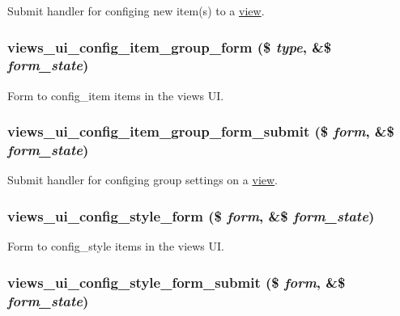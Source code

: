 \label{admin_8inc_a023993084cf3409a55a8831df1d0935b}
Submit handler for configing new item(s) to a \hyperlink{classview}{view}. \hypertarget{admin_8inc_a2ae4ffd902cc9eb9ac94f7ed69ffe81a}{
\subsubsection[{views\_\-ui\_\-config\_\-item\_\-group\_\-form}]{\setlength{\rightskip}{0pt plus 5cm}views\_\-ui\_\-config\_\-item\_\-group\_\-form (\$ {\em type}, \/  \&\$ {\em form\_\-state})}}
\label{admin_8inc_a2ae4ffd902cc9eb9ac94f7ed69ffe81a}
Form to config\_\-item items in the views UI. \hypertarget{admin_8inc_a88a6d4a52ff968ae9dd477d60c715d50}{
\subsubsection[{views\_\-ui\_\-config\_\-item\_\-group\_\-form\_\-submit}]{\setlength{\rightskip}{0pt plus 5cm}views\_\-ui\_\-config\_\-item\_\-group\_\-form\_\-submit (\$ {\em form}, \/  \&\$ {\em form\_\-state})}}
\label{admin_8inc_a88a6d4a52ff968ae9dd477d60c715d50}
Submit handler for configing group settings on a \hyperlink{classview}{view}. \hypertarget{admin_8inc_a481bebc8369cec52e18eb114b9121bab}{
\subsubsection[{views\_\-ui\_\-config\_\-style\_\-form}]{\setlength{\rightskip}{0pt plus 5cm}views\_\-ui\_\-config\_\-style\_\-form (\$ {\em form}, \/  \&\$ {\em form\_\-state})}}
\label{admin_8inc_a481bebc8369cec52e18eb114b9121bab}
Form to config\_\-style items in the views UI. \hypertarget{admin_8inc_a421a319ebb088e20841e643f67ab1cfe}{
\subsubsection[{views\_\-ui\_\-config\_\-style\_\-form\_\-submit}]{\setlength{\rightskip}{0pt plus 5cm}views\_\-ui\_\-config\_\-style\_\-form\_\-submit (\$ {\em form}, \/  \&\$ {\em form\_\-state})}}
